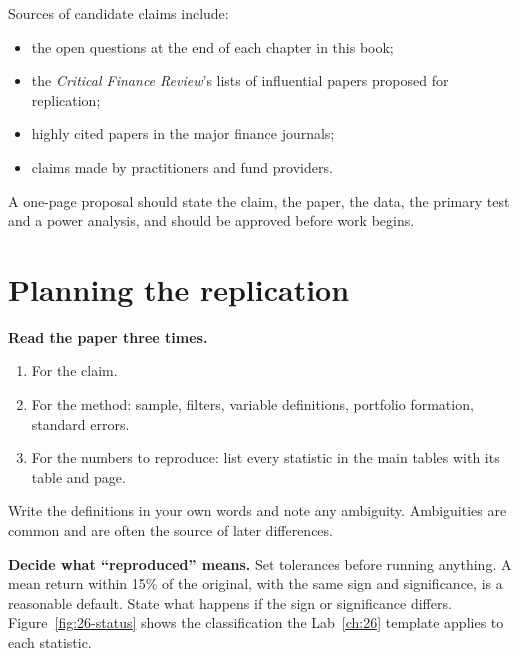 Sources of candidate claims include:

\begin{itemize}
  \item the open questions at the end of each chapter in this book;
  \item the \emph{Critical Finance Review}'s lists of influential papers proposed for replication;
  \item highly cited papers in the major finance journals;
  \item claims made by practitioners and fund providers.
\end{itemize}

A one-page proposal should state the claim, the paper, the data, the primary test and a power analysis, and should be approved before work begins.

\section{Planning the replication}
\label{sec:26-planning}

\textbf{Read the paper three times.}

\begin{enumerate}
  \item For the claim.
  \item For the method: sample, filters, variable definitions, portfolio formation, standard errors.
  \item For the numbers to reproduce: list every statistic in the main tables with its table and page.
\end{enumerate}

Write the definitions in your own words and note any ambiguity. Ambiguities are common and are often the source of later differences.

\textbf{Decide what ``reproduced'' means.} Set tolerances before running anything. A mean return within 15\% of the original, with the same sign and significance, is a reasonable default. State what happens if the sign or significance differs. Figure~\ref{fig:26-status} shows the classification the Lab~\ref{ch:26} template applies to each statistic.

